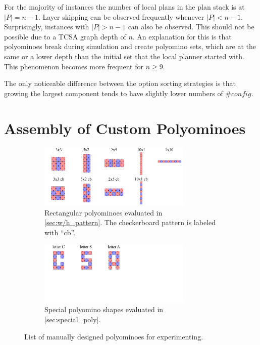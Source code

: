 For the majority of instances the number of local plans in the plan stack is at $|P| = n-1$.
Layer skipping can be observed frequently whenever $|P| < n-1$.
Surprisingly, instances with $|P| > n-1$ can also be observed.
This should not be possible due to a TCSA graph depth of $n$.
An explanation for this is that polyominoes break during simulation and create polyomino sets, which are at the same or a lower depth than the initial set that the local planner started with.
This phenomenon becomes more frequent for $n \geq 9$.

The only noticeable difference between the option sorting strategies is that growing the largest component tends to have slightly lower numbers of $\#\textit{config}$.


\section{Assembly of Custom Polyominoes}
\label{sec:AFTS}

\begin{figure}
	\centering
	\begin{subfigure}[b]{\textwidth}
		\centering
		\includegraphics[width=0.8\textwidth]{figures/AFTS_cb_shapes.pdf}
		\caption{Rectangular polyominoes evaluated in \ref{sec:w/h_pattern}. The checkerboard pattern is labeled with ``cb''. \hfill}
		\label{fig:AFTS_cb_shapes}
	\end{subfigure}
	\begin{subfigure}[b]{\textwidth}
		\centering
		\includegraphics[width=0.8\textwidth]{figures/AFTS_sp_shapes.pdf}
		\caption{Special polyomino shapes evaluated in \autoref{sec:special_poly}.}
		\label{fig:AFTS_sp_shapes}
	\end{subfigure}
	\caption[List of manually designed polyominoes for experimenting]{List of manually designed polyominoes for experimenting.}
	\label{fig:AFTS_shapes}
\end{figure}

